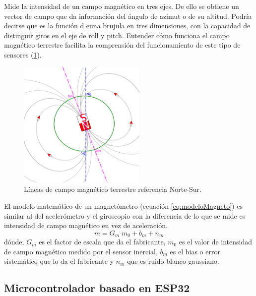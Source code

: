 \begin{itemize}
		Mide la intensidad de un campo magnético en tres ejes. De ello se obtiene un vector de campo que da información del ángulo de azimut o de su altitud. Podría decirse que es la función d euna brujula en tres dimensiones, con la capacidad de distinguir giros en el eje de roll y pitch. Entender cómo funciona el campo magnético terrestre facilita la comprensión del funcionamiento de este tipo de sensores (\ref{fig:campoMag}).
		
		\begin{figure}[H]
			\centering
			\includegraphics[width=0.55\textwidth]{./img/IMUmagneto}
			\caption{Líneas de campo magnético terrestre referencia Norte-Sur. \cite{juanDiego}} 
			\label{fig:campoMag}
		\end{figure} 
		
		El modelo matemático de un magnetómetro (ecuación \ref{eq:modeloMagneto}) es similar al del acelerómetro y el giroscopio con la diferencia de lo que se mide es intensidad de campo magnético en vez de aceleración. 
		\begin{equation}
			\label{eq:modeloMagneto}
			m = G_{m}\; m_{0} + b_{m} + n_{m}
		\end{equation}
		dónde, $ G_{m} $ es el factor de escala que da el fabricante, $m_{0} $ es el valor de intensidad de campo magnético medido por el sensor inercial,  $ b_{m} $ es el bias o error sistemático que lo da el fabricante y $ n_{m} $ que es ruido blanco gaussiano.
		
		
	\end{itemize}
	


\subsection{Microcontrolador basado en ESP32}
\label{sec:esp324}

